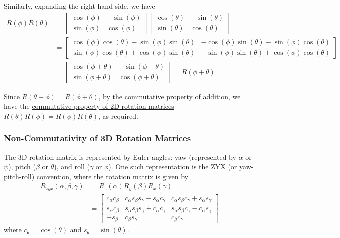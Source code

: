 Similarly, expanding the right-hand side, we have
\begin{align*}
    R(\phi)R(\theta)
     & =
    \begin{bmatrix}
        \cos(\phi) & -\sin(\phi) \\
        \sin(\phi) & \cos(\phi)
    \end{bmatrix}
    \begin{bmatrix}
        \cos(\theta) & -\sin(\theta) \\
        \sin(\theta) & \cos(\theta)
    \end{bmatrix}
    \\ & =
    \begin{bmatrix}
        \cos(\phi)\cos(\theta) - \sin(\phi)\sin(\theta) & -\cos(\phi)\sin(\theta) - \sin(\phi)\cos(\theta) \\
        \sin(\phi)\cos(\theta) + \cos(\phi)\sin(\theta) & -\sin(\phi)\sin(\theta) + \cos(\phi)\cos(\theta)
    \end{bmatrix}
    \\ & =
    \begin{bmatrix}
        \cos(\phi + \theta) & -\sin(\phi + \theta) \\
        \sin(\phi + \theta) & \cos(\phi + \theta)
    \end{bmatrix}
    =
    R(\phi + \theta)
\end{align*}

Since \( R(\theta + \phi) = R(\phi + \theta) \), by the commutative property of addition, we have the \underline{commutative property of 2D rotation matrices} \( R(\theta)R(\phi) = R(\phi)R(\theta) \), as required.

\subsubsection*{Non-Commutativity of 3D Rotation Matrices}

The 3D rotation matrix is represented by Euler angles: yaw (represented by \( \alpha \) or \( \psi \)), pitch (\( \beta \) or \( \theta \)), and roll (\( \gamma \) or \( \phi \)).
One such representation is the ZYX (or yaw-pitch-roll) convention, where the rotation matrix is given by
\begin{align*}
    R_{zyx}(\alpha, \beta, \gamma)
     & =
    R_z(\alpha)R_y(\beta)R_x(\gamma)
    \\ & =
    \begin{bmatrix}
        c_{\alpha} c_{\beta} & c_{\alpha} s_{\beta} s_{\gamma} - s_{\alpha} c_{\gamma} & c_{\alpha} s_{\beta} c_{\gamma} + s_{\alpha} s_{\gamma} \\
        s_{\alpha} c_{\beta} & s_{\alpha} s_{\beta} s_{\gamma} + c_{\alpha} c_{\gamma} & s_{\alpha} s_{\beta} c_{\gamma} - c_{\alpha} s_{\gamma} \\
        -s_{\beta}           & c_{\beta} s_{\gamma}                                    & c_{\beta} c_{\gamma}
    \end{bmatrix}
\end{align*}
where \( c_{\theta} = \cos(\theta) \) and \( s_{\theta} = \sin(\theta) \).

